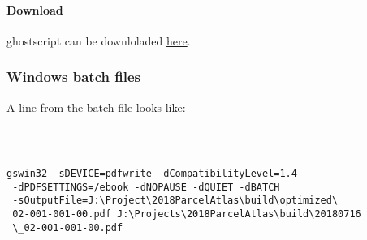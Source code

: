 \paragraph{Download}
ghostscript can be downloladed \href{https://www.ghostscript.com/download/gsdnld.html}{here}.


\subsubsection{Windows batch files}
A line from the batch file looks like:\\
\begin{verbatim}



gswin32 -sDEVICE=pdfwrite -dCompatibilityLevel=1.4
 -dPDFSETTINGS=/ebook -dNOPAUSE -dQUIET -dBATCH
 -sOutputFile=J:\Project\2018ParcelAtlas\build\optimized\
 02-001-001-00.pdf J:\Projects\2018ParcelAtlas\build\20180716
 \_02-001-001-00.pdf

\end{verbatim}


